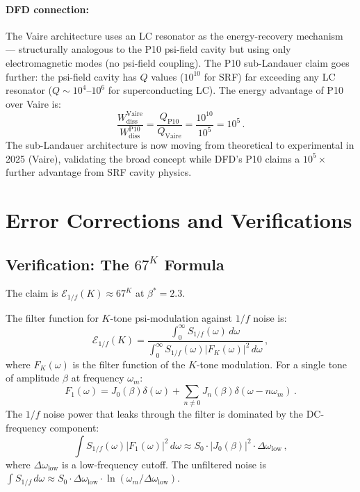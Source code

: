 \documentclass[11pt]{article}
\theoremstyle{definition}
\theoremstyle{remark}
\begin{document}
\paragraph{DFD connection:} The Vaire architecture uses an LC resonator as
the energy-recovery mechanism --- structurally analogous to the P10 psi-field
cavity but using only electromagnetic modes (no psi-field coupling). The P10
sub-Landauer claim goes further: the psi-field cavity has $Q$ values ($10^{10}$
for SRF) far exceeding any LC resonator ($Q \sim 10^4$--$10^6$ for
superconducting LC). The energy advantage of P10 over Vaire is:
\begin{equation}
\frac{W_{\mathrm{diss}}^{\mathrm{Vaire}}}{W_{\mathrm{diss}}^{\mathrm{P10}}}
= \frac{Q_{\mathrm{P10}}}{Q_{\mathrm{Vaire}}} = \frac{10^{10}}{10^5} = 10^5\,.
\end{equation}
The sub-Landauer architecture is now moving from theoretical to experimental in
2025 (Vaire), validating the broad concept while DFD's P10 claims a
$10^5\times$ further advantage from SRF cavity physics.

\section{Error Corrections and Verifications}
\label{sec:errors}

\subsection{Verification: The $67^K$ Formula}
\label{sec:verify-67K}

The claim is $\mathcal{E}_{1/f}(K) \approx 67^K$ at $\beta^* = 2.3$.

The filter function for $K$-tone psi-modulation against $1/f$ noise is:
\begin{equation}
\mathcal{E}_{1/f}(K) = \frac{\int_0^\infty S_{1/f}(\omega)\,d\omega}
{\int_0^\infty S_{1/f}(\omega)|F_K(\omega)|^2\,d\omega}\,,
\end{equation}
where $F_K(\omega)$ is the filter function of the $K$-tone modulation. For
a single tone of amplitude $\beta$ at frequency $\omega_m$:
\begin{equation}
F_1(\omega) = J_0(\beta)\delta(\omega) + \sum_{n\neq 0} J_n(\beta)
\delta(\omega - n\omega_m)\,.
\end{equation}
The $1/f$ noise power that leaks through the filter is dominated by the
DC-frequency component:
\begin{equation}
\int S_{1/f}(\omega)|F_1(\omega)|^2\,d\omega \approx
S_0 \cdot |J_0(\beta)|^2 \cdot \Delta\omega_{\mathrm{low}}\,,
\end{equation}
where $\Delta\omega_{\mathrm{low}}$ is a low-frequency cutoff. The unfiltered
noise is $\int S_{1/f}\,d\omega \approx S_0 \cdot \Delta\omega_{\mathrm{low}}
\cdot \ln(\omega_m/\Delta\omega_{\mathrm{low}})$.
\end{document}
